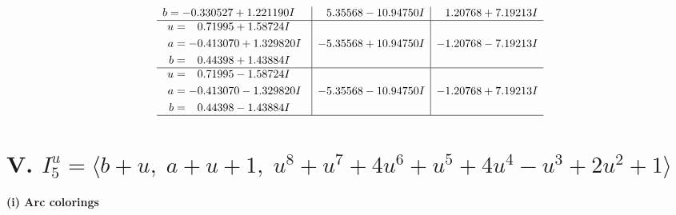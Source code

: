 \documentclass[1p]{elsarticle_modified}
\theoremstyle{definition}
\begin{document}
$$\begin{array}{c|c|c}
\begin{aligned}
b &= -0.330527 + 1.221190 I\end{aligned}
 & \phantom{-}5.35568 - 10.94750 I & \phantom{-}1.20768 + 7.19213 I \\ \hline\begin{aligned}
u &= \phantom{-}0.71995 + 1.58724 I \\
a &= -0.413070 + 1.329820 I \\
b &= \phantom{-}0.44398 + 1.43884 I\end{aligned}
 & -5.35568 + 10.94750 I & -1.20768 - 7.19213 I \\ \hline\begin{aligned}
u &= \phantom{-}0.71995 - 1.58724 I \\
a &= -0.413070 - 1.329820 I \\
b &= \phantom{-}0.44398 - 1.43884 I\end{aligned}
 & -5.35568 - 10.94750 I & -1.20768 + 7.19213 I\\
 \hline 
 \end{array}$$\newpage\newpage\renewcommand{\arraystretch}{1}
\centering \section*{V. $I^u_{5}= \langle b+u,\;a+u+1,\;u^8+u^7+4 u^6+u^5+4 u^4- u^3+2 u^2+1 \rangle$}
\flushleft \textbf{(i) Arc colorings}\\
\end{document}
